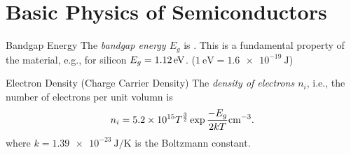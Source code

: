 \documentclass[testmode]{highlights}
\begin{document}
\section{Basic Physics of Semiconductors}
\begin{concept}{Bandgap Energy}
  The \emph{bandgap energy $E_g$} is .
  This is a fundamental property of the material, e.g., for silicon $E_g = \memorize{\qty{1.12}{\eV}}$.
  ($\qty{1}{\eV} = \qty{1.6e-19}{\J}$)
\end{concept}

\begin{concept}{Electron Density (Charge Carrier Density)}
  The \emph{density of electrons $n_i$}, i.e., the number of electrons per unit volumn is
  \begin{equation}
    n_i = \memorize{\num{5.2e15} T^{\frac{3}{2}} \exp \frac{-E_g}{2kT} \unit[per-mode=power]{\per\cubic\cm}}.
  \end{equation}
  where $k = \qty{1.39e-23}{\J\per\K}$ is the Boltzmann constant.
\end{concept}
\end{document}
